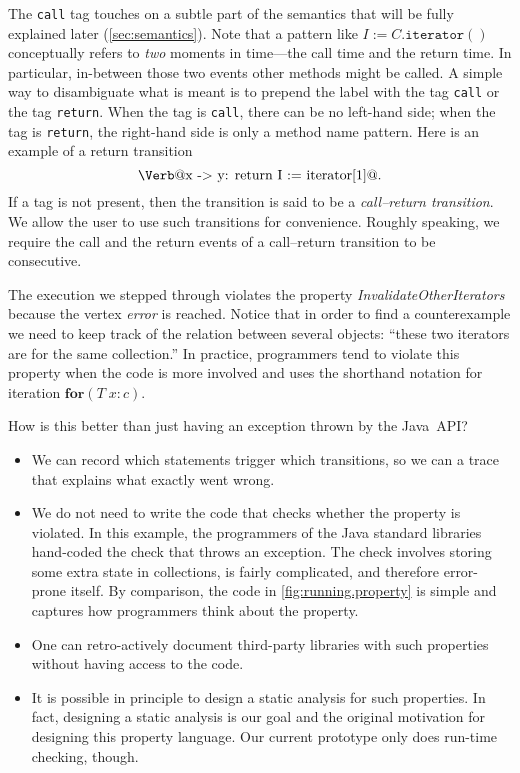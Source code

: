 \documentclass[preprint]{sigplanconf} %
\makeatletter
\newcommand{\verbline}[2][]{\[\text{\Verb@#2@}#1\]}
\theoremstyle{definition}
\makeatother
\begin{document}
The \texttt{call} tag touches on a subtle part of the semantics that will be fully explained later (\autoref{sec:semantics}).
Note that a pattern like $I:=C.\mathtt{iterator}()$ conceptually refers to \emph{two} moments in time---the call time and the return time.
In particular, in-between those two events other methods might be called.
A simple way to disambiguate what is meant is to prepend the label with the tag \texttt{call} or the tag \texttt{return}.
When the tag is \texttt{call}, there can be no left-hand side;
when the tag is \texttt{return}, the right-hand side is only a method name pattern.
Here is an example of a return transition \verbline[.]{x -> y: return I := iterator[1]}
If a tag is not present, then the transition is said to be a \emph{call--return transition}.
We allow the user to use such transitions for convenience.
Roughly speaking, we require the call and the return events of a call--return transition to be consecutive.

The execution we stepped through violates the property \textit{InvalidateOtherIterators} because the vertex \textit{error} is reached.
Notice that in order to find a counterexample we need to keep track of the relation between several objects: ``these two iterators are for the same collection.''
In practice, programmers tend to violate this property when the code is more involved and uses the shorthand notation for iteration $\mathbf{for}(T\;x:c)$.

How is this better than just having an exception thrown by the Java~API\null?
\begin{itemize}
\item We can record which statements trigger which transitions, so we can a trace that explains what exactly went wrong.
\item We do not need to write the code that checks whether the property is violated.
  In this example, the programmers of the Java standard libraries hand-coded the check that throws an exception.
  The check involves storing some extra state in collections, is fairly complicated, and therefore error-prone itself.
  By comparison, the code in \autoref{fig:running.property} is simple and captures how programmers think about the property.
\item One can retro-actively document third-party libraries with such properties without having access to the code.
\item It is possible in principle to design a static analysis for such properties.
  In fact, designing a static analysis is our goal and the original motivation for designing this property language.
  Our current prototype only does run-time checking, though.
\end{itemize}
\end{document}
